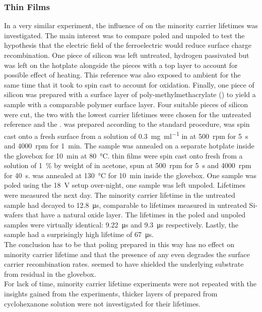 \subsubsection{\pvdf{} Thin Films}
In a very similar experiment, the influence of \pvdf{} on the minority carrier lifetimes was investigated. The main interest was to compare poled and unpoled \pvdf{} to test the hypothesis that the electric field of the ferroelectric would reduce surface charge recombination. One piece of silicon was left untreated, \ie{} hydrogen passivated but was left on the hotplate alongside the pieces with a \pvdf{} top layer to account for possible effect of heating. This reference was also exposed to ambient for the same time that it took to spin cast \pvdf{} to account for oxidation. Finally, one piece of silicon was prepared with a surface layer of poly-methylmethacrylate (\pmma{}) to yield a sample with a comparable polymer surface layer. Four suitable pieces of silicon were cut, the two with the lowest carrier lifetimes were chosen for the untreated \sih{} reference and the \pmma{}. \sih{} was prepared according to the standard procedure, \pmma{} was spin cast onto a fresh \sih{} surface from a solution of \SI{0.3}{\milli\gram\per\milli\litre} \pmma{} in \thf{} at \SI{500}{rpm} for \SI{5}{\second} and \SI{4000}{rpm} for \SI{1}{\minute}. The sample was annealed on a separate hotplate inside the glovebox for \SI{10}{\minute} at \SI{80}{\degreeCelsius}. \pvdf{} thin films were spin cast onto fresh \sih{} from a solution of \SI{1}{\percent} by weight of \pvdf{} in acetone, spun at \SI{500}{rpm} for \SI{5}{\second} and \SI{4000}{rpm} for \SI{40}{\second}. \pvdf{} was annealed at \SI{130}{\degreeCelsius} for \SI{10}{\minute} inside the glovebox. One sample was poled using the \SI{18}{\volt} setup over-night, one sample was left unpoled. Lifetimes were measured the next day. The minority carrier lifetime in the untreated sample had decayed to \SI{12.8}{\micro\second}, comparable to lifetimes measured in untreated Si-wafers that have a natural oxide layer. The lifetimes in the poled and unpoled \pvdf{} samples were virtually identical: \SI{9.22}{\micro\second} and \SI{9.3}{\micro\second} respectively. Lastly, the \pmma{} sample had a surprisingly high lifetime of \SI{67}{\micro\second}.\\
The conclusion has to be that poling \pvdf{} prepared in this way has no effect on minority carrier lifetime and that the presence of any \pvdf{} even degrades the surface carrier recombination rates. \pmma{} seemed to have shielded the underlying substrate from residual \oxy{} in the glovebox.\\
For lack of time, minority carrier lifetime experiments were not repeated with the insights gained from the \cpd{} experiments, \ie{} thicker layers of \pvdf{} prepared from cyclohexanone solution were not investigated for their lifetimes.

